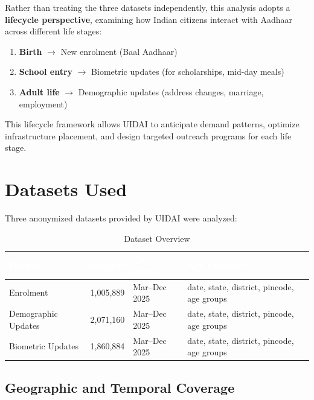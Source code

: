 \documentclass[11pt,a4paper]{article}
\begin{document}
Rather than treating the three datasets independently, this analysis adopts a \textbf{lifecycle perspective}, examining how Indian citizens interact with Aadhaar across different life stages:

\begin{enumerate}
    \item \textbf{Birth} $\rightarrow$ New enrolment (Baal Aadhaar)
    \item \textbf{School entry} $\rightarrow$ Biometric updates (for scholarships, mid-day meals)
    \item \textbf{Adult life} $\rightarrow$ Demographic updates (address changes, marriage, employment)
\end{enumerate}

This lifecycle framework allows UIDAI to anticipate demand patterns, optimize infrastructure placement, and design targeted outreach programs for each life stage.

\section{Datasets Used}

Three anonymized datasets provided by UIDAI were analyzed:

\begin{table}[H]
\centering
\caption{Dataset Overview}
\label{tab:datasets}
\begin{tabular}{llll}
\toprule
\rowcolor{primaryblue}
\textcolor{white}{\textbf{Dataset}} & \textcolor{white}{\textbf{Records}} & \textcolor{white}{\textbf{Date Range}} & \textcolor{white}{\textbf{Key Columns}} \\
\midrule
Enrolment & 1,005,889 & Mar--Dec 2025 & date, state, district, pincode, age groups \\
Demographic Updates & 2,071,160 & Mar--Dec 2025 & date, state, district, pincode, age groups \\
Biometric Updates & 1,860,884 & Mar--Dec 2025 & date, state, district, pincode, age groups \\
\bottomrule
\end{tabular}
\end{table}

\subsection{Geographic and Temporal Coverage}
\end{document}

